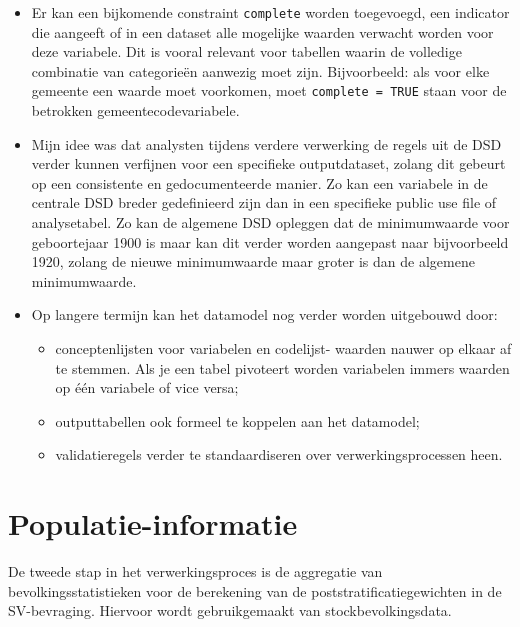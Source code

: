 \documentclass{VSAnote}
\begin{document}
\begin{itemize}

\item Er kan een bijkomende constraint \verb+complete+ worden toegevoegd, een indicator die aangeeft of in een dataset alle mogelijke waarden verwacht worden voor deze variabele. Dit is vooral relevant voor tabellen waarin de volledige combinatie van categorieën aanwezig moet zijn. Bijvoorbeeld: als voor elke gemeente een waarde moet voorkomen, moet \texttt{complete = TRUE} staan voor de betrokken gemeentecodevariabele.

\item Mijn idee was dat analysten tijdens verdere verwerking de regels uit de DSD verder kunnen verfijnen voor een specifieke outputdataset, zolang dit gebeurt op een consistente en gedocumenteerde manier. Zo kan een variabele in de centrale DSD breder gedefinieerd zijn dan in een specifieke public use file of analysetabel. Zo kan de algemene DSD opleggen dat de minimumwaarde voor geboortejaar 1900 is maar kan dit verder worden aangepast naar bijvoorbeeld 1920, zolang de nieuwe minimumwaarde maar groter is dan de algemene minimumwaarde.

\item Op langere termijn kan het datamodel nog verder worden uitgebouwd door:
\begin{itemize}[nosep]
\item conceptenlijsten voor variabelen en codelijst- waarden nauwer op elkaar af te stemmen. Als je een tabel pivoteert worden variabelen immers waarden op één variabele of vice versa;
\item outputtabellen ook formeel te koppelen aan het datamodel;
\item validatieregels verder te standaardiseren over verwerkingsprocessen heen.
\end{itemize}

\end{itemize}










\section{Populatie-informatie}

De tweede stap in het verwerkingsproces is de aggregatie van bevolkingsstatistieken voor de berekening van de poststratificatiegewichten in de SV-bevraging. Hiervoor wordt gebruikgemaakt van stockbevolkingsdata.
\end{document}
